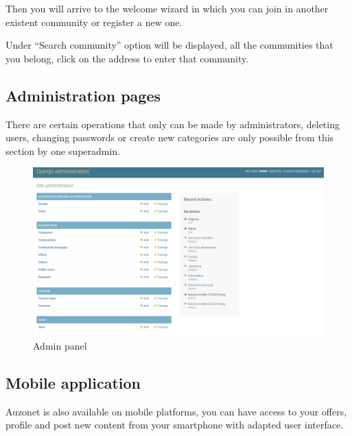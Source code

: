 \documentclass{DeustoFDP}
\begin{document}
Then you will arrive to the welcome wizard in which you can join in another existent community or register a new one.

Under “Search community” option will be displayed, all the communities that you belong, click on the address to enter that community.
\newpage
\subsection{Administration pages}
There are certain operations that only can be made by administrators, deleting users, changing passwords or create new categories are only possible from this section by one superadmin.

\begin{figure}[h!]
\centering
\includegraphics[width=0.9\linewidth]{fig/Manual/adminpanel}
\caption[Admin panel]{Admin panel}
\label{fig:adminpanel}
\end{figure}
\newpage
\subsection{Mobile application}
Auzonet is also available on mobile platforms, you can have access to your offers, profile and post new content from your smartphone with adapted user interface.
\end{document}
